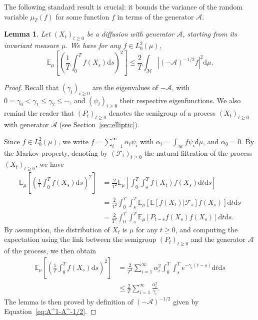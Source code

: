 \documentclass[10pt,a4paper]{article}
\newcommand{\E}{{\mathbb E}}
\newcommand\cA{\mathcal{A}}
\newcommand\cF{\mathcal{F}}
\newcommand\cM{\mathcal{M}}
\newcommand\dd{\mathrm{d}}
\newcommand{\ABS}[1]{{{\left| #1 \right|}}} %
\newcommand{\PAR}[1]{{{\left(#1\right)}}} %
\newcommand{\SBRA}[1]{{{\left[#1\right]}}} %
\newtheorem{lemma}[theorem]{Lemma}
\begin{document}
The following standard result is crucial: it bounds the variance of the random variable $\mu_T(f)$ for some function $f$ in terms of the generator $\cA$.



\begin{lemma}\label{lemma: var-lem2}
	Let $(X_t)_{t\ge 0}$ be a diffusion with generator $\cA$, starting from its invariant measure $\mu$. We have for any $f\in L^2_0(\mu)$,
	\[
	\E_{\mu}\SBRA{\PAR{\frac{1}{T}\int_0^Tf(X_s)\dd s}^2}\le \frac{2}{T}\int_\cM\ABS{\PAR{-\cA}^{-1/2}f}^2\dd \mu.
	\]
		
\end{lemma}



\begin{proof} Recall that $(\gamma_i)_{i\ge0}$ are the eigenvalues of $-\cA$, with $0=\gamma_0<\gamma_1\le\gamma_2\le\cdots$, and $(\psi_i)_{i\ge 0}$ their respective eigenfunctions. We also remind  the reader that $(P_t)_{t\ge 0}$  denotes the semigroup of a process $(X_t)_{t\ge 0}$ with generator $\cA$ (see Section~\ref{sec:elliptic}).

	Since $f\in L^2_0(\mu)$, we write $
	\displaystyle{f=\sum_{i=1}^\infty\alpha_i\psi_i}$ with $\alpha_i=\int_\cM f\psi_i\dd \mu$, and $\alpha_0=0$.
	By the Markov property, denoting by $\PAR{\cF_t}_{t\ge 0}$ the natural filtration of the process $(X_t)_{t\ge 0}$, we have
	\begin{align*}
		\E_\mu\SBRA{\PAR{\frac{1}{T}\int_0^Tf(X_s)\dd s}^2}&=\frac{2}{T^2}\E_\mu\SBRA{\int_0^T\int_s^Tf(X_t)f(X_s)\dd t\dd s}\\
		&=\frac{2}{T^2}\int_0^T\int_s^T\E_\mu\SBRA{\E\SBRA{f(X_t)|\cF_s}f(X_s)}\dd t\dd s\\
		&=\frac{2}{T^2}\int_0^T\int_s^{T}\E_\mu\SBRA{P_{t-s}f(X_s)f(X_s)}\dd t\dd s.
	\end{align*}
	By assumption, the distribution of $X_t$ is $\mu$ for any $ t\ge 0$, and computing the expectation using the link between the semigroup $(P_t)_{t\ge 0}$ and the generator $\cA$ of the process, we then obtain
	\begin{align*}
		\E_\mu\SBRA{\PAR{\frac{1}{T}\int_0^Tf(X_s)\dd s}^2}
		&=\frac{2}{T^2}\sum_{i=1}^\infty\alpha_i^2\int_0^T\int_s^{T} e^{-\gamma_i(t-s)}\dd t\dd s\\
		&\le \frac{2}{T}\sum_{i=1}^\infty\frac{\alpha_i^2}{\gamma_i} .
	\end{align*}
	The lemma is then proved by definition of $(-\cA)^{-1/2}$ given by Equation~\eqref{eq:A^1-A^-1/2}.
\end{proof}
\end{document}
